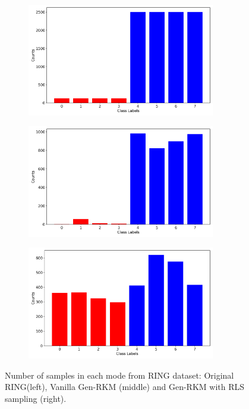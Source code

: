 \begin{figure}[ht]
    \centering
    \begin{subfigure}{0.32\textwidth}
        \centering
        \includegraphics[width=0.9\textwidth]{Figures/Methods/ring_dis.png}
    \end{subfigure}
    \begin{subfigure}{0.32\textwidth}
        \centering
        \includegraphics[width=0.9\textwidth]{Figures/Methods/ring_rkm.png}
    \end{subfigure}
    \begin{subfigure}{0.32\textwidth}
        \centering
        \includegraphics[width=0.9\textwidth]{Figures/Methods/ring_rls.png}
    \end{subfigure}
    \caption{Number of samples in each mode from RING dataset: Original RING(left), Vanilla Gen-RKM (middle) and Gen-RKM with RLS sampling (right).}
    \label{fig-ring-rkm}
\end{figure}

